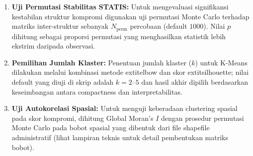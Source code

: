\begin{enumerate}
    \begin{align*}
        g_{\text{PPM},1,2020}^{(\text{visual})} &= 0{,}8306 \times 1{,}5168 = 1{,}2599 \\
        g_{\text{PPM},2,2020}^{(\text{visual})} &= 0{,}5569 \times 0{,}8362 = 0{,}4657
    \end{align*}
    Apabila konfigurasi \textit{mirror} PC1 aktif (seperti pada Skenario 1 studi kasus ini), nilai PC1 Visual selanjutnya dinegatifkan: $g_{\text{PPM},1}^{(\text{visual})} = -1{,}2599$. Skor intra $\mathbf{F}_k$ tidak mengalami perubahan amplitudo --- hanya tanda yang dapat berubah bila \textit{mirror} aktif. Penyesuaian ini hanya berlaku untuk plotting dan tidak mengubah nilai analitis atau kesimpulan inferensial.
    \item \textbf{Uji Permutasi Stabilitas STATIS:} Untuk mengevaluasi signifikansi kestabilan struktur kompromi digunakan uji permutasi Monte Carlo terhadap matriks inter-struktur sebanyak $N_{\mathrm{perm}}$ percobaan (default $1000$). Nilai $p$ dihitung sebagai proporsi permutasi yang menghasilkan statistik lebih ekstrim daripada observasi.
    \item \textbf{Pemilihan Jumlah Klaster:} Penentuan jumlah klaster ($k$) untuk K-Means dilakukan melalui kombinasi metode 	extit{elbow} dan skor 	extit{silhouette}; nilai default yang diuji di skrip adalah $k=2\text{--}5$ dan hasil akhir dipilih berdasarkan keseimbangan antara compactness dan interpretabilitas.
    \item \textbf{Uji Autokorelasi Spasial:} Untuk menguji keberadaan clustering spasial pada skor kompromi, dihitung Global Moran's $I$ dengan prosedur permutasi Monte Carlo pada bobot spasial yang dibentuk dari file shapefile administratif (lihat lampiran teknis untuk detail pembentukan matriks bobot).
\end{enumerate}

